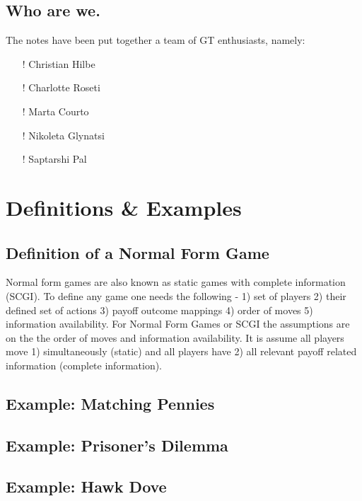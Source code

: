 \documentclass{article}
\begin{document}
\subsection{Who are we.}

The notes have been put together a team of GT enthusiasts, namely:

\begin{itemize}
    \item [!] Christian Hilbe
    \item [!] Charlotte Roseti
    \item [!] Marta Courto
    \item [!] Nikoleta Glynatsi
    \item [!] Saptarshi Pal
\end{itemize}

\section{Definitions \& Examples}

\subsection{Definition of a Normal Form Game}

Normal form games are also known as static games with complete information (SCGI). To define any game one needs the following - 1) set of players 2) their defined set of actions 3) payoff outcome mappings 4) order of moves 5) information availability. For Normal Form Games or SCGI the assumptions are on the the order of moves and information availability. It is assume all players move 1) simultaneously (static) and all players have 2) all relevant payoff related information (complete information). 


\subsection{Example: Matching Pennies}





\subsection{Example: Prisoner's Dilemma}





\subsection{Example: Hawk Dove}
\end{document}
